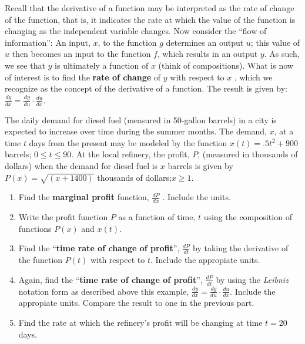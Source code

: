 \noindent Recall that the derivative of a function may be interpreted as the rate of change of the function, that is, it indicates the rate at which the value of the function is changing as the independent variable changes.  Now consider the “flow of information”:  An input, $x$, to the function $g$ determines an output $u$; this value of $u$ then becomes an input to the function $f$, which results in an output $y$.  As such, we see that $y$ is ultimately a function of $x$ (think of compositions).  What is now of interest is to find the \textbf{rate of change} of $y$ with respect to $x $ , which we recognize as the concept of the derivative of a function.  The result is given by: $\displaystyle\frac{dy}{dx}=\frac{dy}{du}\cdot \frac{du}{dx}$.

\begin{example}
The daily demand for diesel fuel (measured in 50-gallon barrels) in a city is expected to increase over time during the summer months.  The demand, $x$, at a time $t$ days from the present may be modeled by the function $x(t)= .5t^2+900$ barrels; $0\le t\le90$.  At the local refinery, the profit, $P$, (measured in thousands of dollars) when the demand for diesel fuel is $x$ barrels is given by $P(x)=\sqrt{(x+1400)}$ thousands of dollars;$x\ge 1$. 
\renewcommand{\labelenumi}{(\Alph{enumi})}
\begin{enumerate}[leftmargin=*]
    
    \item 	Find the \textbf{marginal profit} function, $\displaystyle\frac{dP}{dx}$ .  Include the units.\vspace{0.5in}
    \item Write the profit function $P$ as a function of time, $t$ using the composition of functions $P(x)$ and $x(t)$. \vspace{0.5in}
    \item Find the “\textbf{time rate of change of profit}”, $\displaystyle\frac{dP}{dt}$ by taking the derivative of the function $P(t)$ with respect to $t$. Include the appropiate units.\vspace{0.8in}
    \item Again, find the “\textbf{time rate of change of profit}”, $\displaystyle\frac{dP}{dt}$ by using the \emph{Leibniz} notation form as described above this example,  $\displaystyle\frac{dy}{dx}=\frac{dy}{du}\cdot \frac{du}{dx}$. Include the appropiate units. Compare the result to one in the previous part.\vspace{0.8in}
    \item 	Find the rate at which the refinery’s profit will be changing at time $t=20$ days.



\end{enumerate}
\end{example}
